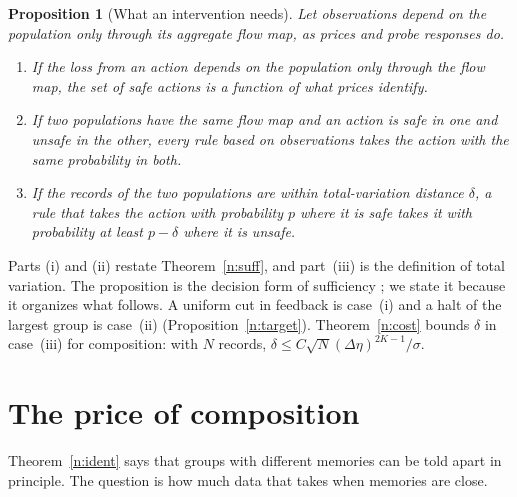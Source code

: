 \documentclass[12pt]{article}
\newtheorem{proposition}[theorem]{Proposition}
\theoremstyle{definition}
\theoremstyle{remark}
\begin{document}
\begin{proposition}[What an intervention needs]\label{n:interv}
Let observations depend on the population only through its aggregate flow map, as prices and probe responses do.
\begin{enumerate}[label=(\roman*),itemsep=1pt]
\item If the loss from an action depends on the population only through the flow map, the set of safe actions is a function of what prices identify.
\item If two populations have the same flow map and an action is safe in one and unsafe in the other, every rule based on observations takes the action with the same probability in both.
\item If the records of the two populations are within total-variation distance $\delta$, a rule that takes the action with probability $p$ where it is safe takes it with probability at least $p-\delta$ where it is unsafe.
\end{enumerate}
\end{proposition}

Parts (i) and (ii) restate Theorem~\ref{n:suff}, and part~(iii) is the definition of total variation. The proposition is the decision form of sufficiency \citep{blackwell1953,lecam1964}; we state it because it organizes what follows. A uniform cut in feedback is case~(i) and a halt of the largest group is case~(ii) (Proposition~\ref{n:target}). Theorem~\ref{n:cost} bounds $\delta$ in case~(iii) for composition: with $N$ records, $\delta\le C\sqrt N(\Delta\eta)^{2K-1}/\sigma$.

\section{The price of composition}\label{n:cost_sec}

Theorem~\ref{n:ident} says that groups with different memories can be told apart in principle. The question is how much data that takes when memories are close.
\end{document}
